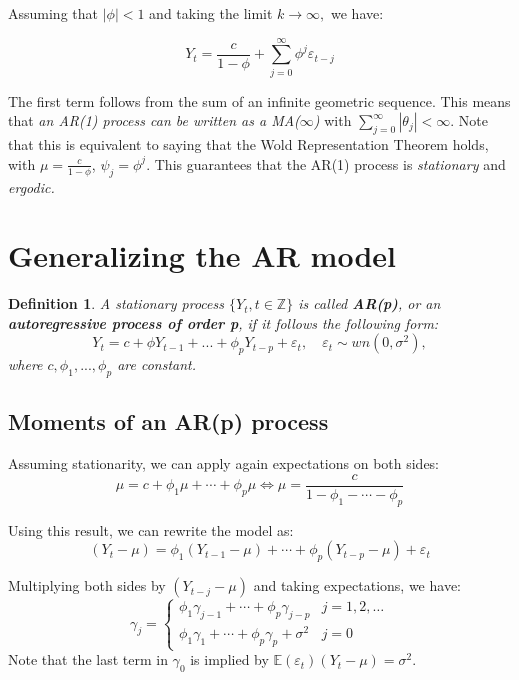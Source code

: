 \documentclass[11pt, a4paper]{report}
\theoremstyle{plain}
\theoremstyle{plain}
\newtheorem{defn}{Definition}[section]
\theoremstyle{remark}
\begin{document}
Assuming that $|\phi|<1$ and taking the limit $k \rightarrow \infty,$ we have:

$$
Y_{t}=\frac{c}{1-\phi}+\sum_{j=0}^{\infty} \phi^{j} \varepsilon_{t-j}
$$

The first term follows from the sum of an infinite geometric sequence. This means that \textit{an AR(1) process can be written as a MA($\infty$)} with $\sum_{j = 0}^\infty | \theta_j | < \infty$. Note that this is equivalent to saying that the Wold Representation Theorem holds, with $\mu = \frac{c}{1 - \phi}$, $\psi_j = \phi^j$. This guarantees that the AR(1) process is \textit{stationary} and \textit{ergodic.}

\section{Generalizing the AR model}

\begin{defn}
	A stationary process $\{Y_t, t \in \mathbb{Z} \}$ is called \textbf{AR(p)}, or an \textbf{autoregressive process of order p}, if it follows the following form:
	$$ Y_t = c + \phi Y_{t-1} + ... + \phi_p Y_{t-p} + \varepsilon_t, \hspace{1em} \varepsilon_t \sim wn(0, \sigma^2), $$
	where $c, \phi_1, ..., \phi_p$ are constant.
\end{defn}

\subsection{Moments of an AR(p) process}

Assuming stationarity, we can apply again expectations on both sides:
$$
\mu=c+\phi_{1} \mu+\cdots+\phi_{p} \mu \Longleftrightarrow \mu=\frac{c}{1-\phi_{1}-\cdots-\phi_{p}}
$$

Using this result, we can rewrite the model as:
$$
\left(Y_{t}-\mu\right)=\phi_{1}\left(Y_{t-1}-\mu\right)+\cdots+\phi_{p}\left(Y_{t-p}-\mu\right)+\varepsilon_{t}
$$

Multiplying both sides by $\left(Y_{t-j}-\mu\right)$ and taking expectations, we have:
$$
\gamma_{j}=\left\{\begin{array}{ll}
	\phi_{1} \gamma_{j-1}+\cdots+\phi_{p} \gamma_{j-p} & j=1,2, \ldots \\
	\phi_{1} \gamma_{1}+\cdots+\phi_{p} \gamma_{p}+\sigma^{2} & j=0
\end{array}\right.
$$
Note that the last term in $\gamma_{0}$ is implied by $\mathbb{E}\left(\varepsilon_{t}\right)\left(Y_{t}-\mu\right)=\sigma^{2}$.
\end{document}
